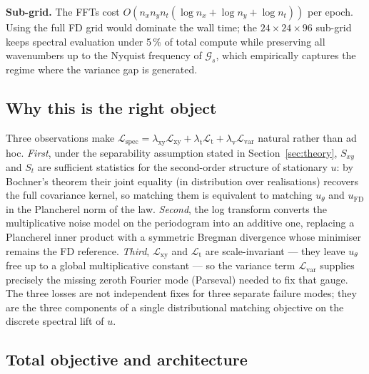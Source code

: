 \documentclass[review,12pt]{elsarticle}
\begin{document}
\textbf{Sub-grid.} The FFTs cost
\(O(n_x n_y n_t (\log n_x + \log n_y + \log n_t))\) per epoch.
Using the full FD grid would dominate the wall time; the
\(24 \times 24 \times 96\) sub-grid keeps spectral evaluation under
5\,\% of total compute while preserving all wavenumbers up to the
Nyquist frequency of \(\mathcal{G}_s\), which empirically captures
the regime where the variance gap is generated.

\subsection{Why this is the right object}
\label{subsec:right-object}

Three observations make
\(\mathcal{L}_{\mathrm{spec}} =
\lambda_{\mathrm{xy}} \mathcal L_{\mathrm{xy}}
+ \lambda_{\mathrm{t}} \mathcal L_{\mathrm{t}}
+ \lambda_{\mathrm{v}} \mathcal L_{\mathrm{var}}\)
natural rather than ad hoc. \emph{First}, under the separability
assumption stated in Section~\ref{sec:theory}, \(S_{xy}\) and
\(S_t\) are sufficient statistics for the second-order structure
of stationary \(u\): by Bochner's theorem their joint equality (in
distribution over realisations) recovers the full covariance
kernel, so matching them is equivalent to matching \(u_\theta\)
and \(u_{\mathrm{FD}}\) in the Plancherel norm of the law.
\emph{Second}, the log transform converts the multiplicative noise
model on the periodogram into an additive one, replacing a
Plancherel inner product with a symmetric Bregman divergence
whose minimiser remains the FD reference. \emph{Third},
\(\mathcal L_{\mathrm{xy}}\) and \(\mathcal L_{\mathrm{t}}\) are
scale-invariant --- they leave \(u_\theta\) free up to a global
multiplicative constant --- so the variance term
\(\mathcal L_{\mathrm{var}}\) supplies precisely the missing
zeroth Fourier mode (Parseval) needed to fix that gauge. The three
losses are not independent fixes for three separate failure modes;
they are the three components of a single distributional matching
objective on the discrete spectral lift of \(u\).

\subsection{Total objective and architecture}
\label{subsec:total-objective}
\end{document}
